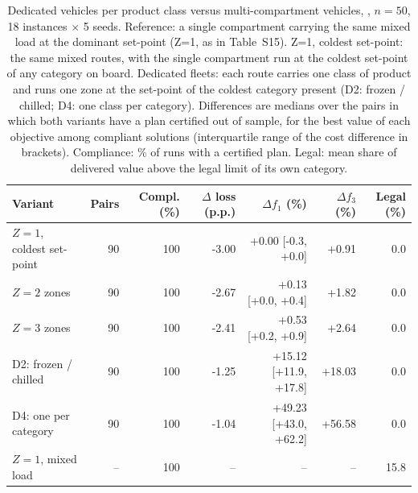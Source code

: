 \begin{table}[htbp]
\centering
\caption{Dedicated vehicles per product class versus multi-compartment vehicles, , $n=50$, 18 instances $\times$ 5 seeds. Reference: a single compartment carrying the same mixed load at the dominant set-point (Z=1, as in Table~S15). Z=1, coldest set-point: the same mixed routes, with the single compartment run at the coldest set-point of any category on board. Dedicated fleets: each route carries one class of product and runs one zone at the set-point of the coldest category present (D2: frozen / chilled; D4: one class per category). Differences are medians over the pairs in which both variants have a plan certified out of sample, for the best value of each objective among compliant solutions (interquartile range of the cost difference in brackets). Compliance: \% of runs with a certified plan. Legal: mean share of delivered value above the legal limit of its own category.}
\label{tab:b3}
\footnotesize\setlength{\tabcolsep}{3pt}
\begin{tabular}{@{}l r r r r r r@{}}
\toprule
Variant & Pairs & Compl. (\%) & $\Delta$ loss (p.p.) & $\Delta f_1$ (\%) & $\Delta f_3$ (\%) & Legal (\%) \\
\midrule
$Z=1$, coldest set-point & 90 & 100 & -3.00 & +0.00 [-0.3, +0.0] & +0.91 & 0.0 \\
$Z=2$ zones & 90 & 100 & -2.67 & +0.13 [+0.0, +0.4] & +1.82 & 0.0 \\
$Z=3$ zones & 90 & 100 & -2.41 & +0.53 [+0.2, +0.9] & +2.64 & 0.0 \\
D2: frozen / chilled & 90 & 100 & -1.25 & +15.12 [+11.9, +17.8] & +18.03 & 0.0 \\
D4: one per category & 90 & 100 & -1.04 & +49.23 [+43.0, +62.2] & +56.58 & 0.0 \\
\midrule
$Z=1$, mixed load & -- & 100 & -- & -- & -- & 15.8 \\
\bottomrule
\end{tabular}
\end{table}
